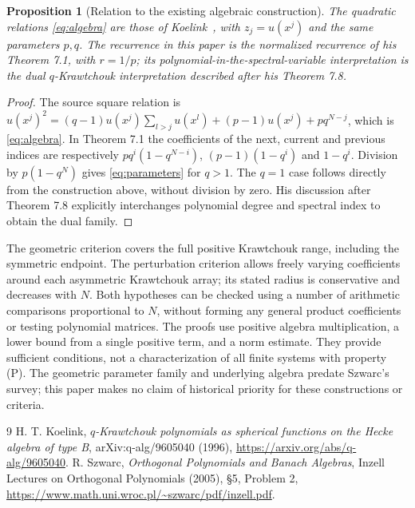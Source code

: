 \documentclass[11pt]{article}
\newtheorem{proposition}[theorem]{Proposition}
\begin{document}
\begin{proposition}[Relation to the existing algebraic construction]\label{prop:source}
The quadratic relations \eqref{eq:algebra} are those of Koelink~\cite[Theorem 3.1(ii), equation (3.3)]{koelink}, with $z_j=u(x^j)$ and the same parameters $p,q$. The recurrence in this paper is the normalized recurrence of his Theorem 7.1, with $r=1/p$; its polynomial-in-the-spectral-variable interpretation is the dual $q$-Krawtchouk interpretation described after his Theorem 7.8.
\end{proposition}
\begin{proof}
The source square relation is $u(x^j)^2=(q-1)u(x^j)\sum_{l>j}u(x^l)+(p-1)u(x^j)+pq^{N-j}$, which is \eqref{eq:algebra}. In Theorem 7.1 the coefficients of the next, current and previous indices are respectively $pq^i(1-q^{N-i})$, $(p-1)(1-q^i)$ and $1-q^i$. Division by $p(1-q^N)$ gives \eqref{eq:parameters} for $q>1$. The $q=1$ case follows directly from the construction above, without division by zero. His discussion after Theorem 7.8 explicitly interchanges polynomial degree and spectral index to obtain the dual family.
\end{proof}

The geometric criterion covers the full positive Krawtchouk range, including the symmetric endpoint. The perturbation criterion allows freely varying coefficients around each asymmetric Krawtchouk array; its stated radius is conservative and decreases with $N$. Both hypotheses can be checked using a number of arithmetic comparisons proportional to $N$, without forming any general product coefficients or testing polynomial matrices. The proofs use positive algebra multiplication, a lower bound from a single positive term, and a norm estimate. They provide sufficient conditions, not a characterization of all finite systems with property (P). The geometric parameter family and underlying algebra predate Szwarc's survey; this paper makes no claim of historical priority for these constructions or criteria.

\begin{thebibliography}{9}
 H. T. Koelink, \emph{$q$-Krawtchouk polynomials as spherical functions on the Hecke algebra of type B}, arXiv:q-alg/9605040 (1996), \url{https://arxiv.org/abs/q-alg/9605040}.
 R. Szwarc, \emph{Orthogonal Polynomials and Banach Algebras}, Inzell Lectures on Orthogonal Polynomials (2005), \S5, Problem 2, \url{https://www.math.uni.wroc.pl/~szwarc/pdf/inzell.pdf}.
\end{thebibliography}
\end{document}
